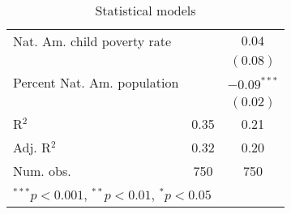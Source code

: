 \begin{table}
\begin{center}
\begin{tabular}{l c c }
Nat. Am. child poverty rate &             & $0.04$        \\
                            &             & $(0.08)$      \\
Percent Nat. Am. population &             & $-0.09^{***}$ \\
                            &             & $(0.02)$      \\
\hline
R$^2$                       & 0.35        & 0.21          \\
Adj. R$^2$                  & 0.32        & 0.20          \\
Num. obs.                   & 750         & 750           \\
\hline
\multicolumn{3}{l}{\scriptsize{$^{***}p<0.001$, $^{**}p<0.01$, $^*p<0.05$}}
\end{tabular}
\caption{Statistical models}
\label{table:coefficients}
\end{center}
\end{table}

